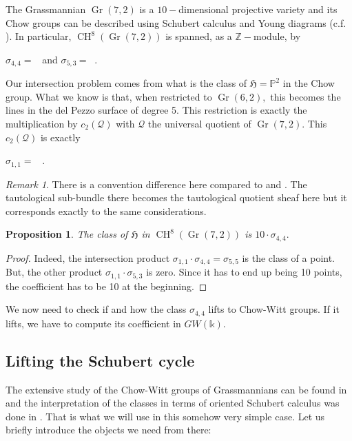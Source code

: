 \documentclass{amsart}
\theoremstyle{plain}%
\newtheorem{prop}[subsubsection]{Proposition}
\theoremstyle{remark}
\newtheorem{rmq}[subsubsection]{Remark}
\theoremstyle{definition}
\newcommand{\cQ}{\mathcal{Q}}
\newcommand{\ek}{\mathbb{k}}
\newcommand{\eP}{\mathbb{P}}
\newcommand{\eZ}{\mathbb{Z}}
\newcommand{\fH}{\mathfrak{H}}
\newcommand{\GW}{GW}
\newcommand{\Grass}{\operatorname{Gr}}
\newcommand{\Chowct}[2][]{\operatorname{CH}^{#1}\!\left( #2 \right)}
\begin{document}
The Grassmannian $\Grass(7,2)$ is a $10-$dimensional projective variety and its Chow groups can be described using Schubert calculus and Young diagrams (c.f. \cite[Chapter 14]{fulton}). In particular, $\Chowct[8]{\Grass(7,2)}$ is spanned, as a $\eZ-$module, by 
\begin{center}
    $\sigma_{4,4}=$ \ and $\sigma_{5,3}\ $= \ .
\end{center}

Our intersection problem comes from what is the class of $\fH = \eP^2$ in the Chow group. What we know is that, when restricted to $\Grass(6,2),$ this becomes the lines in the del Pezzo surface of degree 5. This restriction is exactly the multiplication by $c_2(\cQ)$ with $\cQ$ the universal quotient of $\Grass(7,2).$ This $c_2(\cQ)$ is exactly 
\begin{center}
    $\sigma_{1,1} =$ \ .
\end{center}

\begin{rmq}
There is a convention difference here compared to \cite{fulton} and \cite{Wendt_oriented-schubert}. The tautological sub-bundle there becomes the tautological quotient sheaf here but it corresponds exactly to the same considerations.
\end{rmq}

\begin{prop}
The class of $\fH$ in $\Chowct[8]{\Grass(7,2)}$ is $10\cdot \sigma_{4,4}.$
\end{prop}

\begin{proof}
Indeed, the intersection product $\sigma_{1,1}\cdot \sigma_{4,4} = \sigma_{5,5}$ is the class of a point. But, the other product $\sigma_{1,1}\cdot \sigma_{5,3}$ is zero. Since it has to end up being 10 points, the coefficient has to be 10 at the beginning.
\end{proof}

We now need to check if and how the class $\sigma_{4,4}$ lifts to Chow-Witt groups. If it lifts, we have to compute its coefficient in $\GW(\ek)$.

\subsection{Lifting the Schubert cycle}

The extensive study of the Chow-Witt groups of Grassmannians can be found in \cite{Wendt_CHW-grass} and the interpretation of the classes in terms of oriented Schubert calculus was done in \cite{Wendt_oriented-schubert}. That is what we will use in this somehow very simple case. Let us briefly introduce the objects we need from there:
\end{document}
